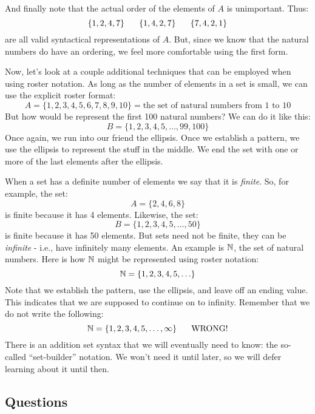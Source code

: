 \documentclass[letterpaper,12pt,fleqn]{article}
\begin{document}
And finally note that the actual order of the elements of $A$ is unimportant.
Thus:
\[\{1,2,4,7\}\hspace{4ex}\{1,4,2,7\}\hspace{4ex}\{7,4,2,1\}\]
are all valid syntactical representations of $A$. But, since we know that
the natural numbers do have an ordering, we feel more comfortable using the
first form.

Now, let's look at a couple additional techniques that can be employed when
using roster notation. As long as the number of elements in a set is small, we
can use the explicit roster format:
\[A=\{1,2,3,4,5,6,7,8,9,10\}=\mbox{the set of natural numbers from 1 to 10}\]
But how would be represent the first 100 natural numbers? We can do it like
this:
\[B=\{1,2,3,4,5,\ldots,99,100\}\]
Once again, we run into our friend the ellipsis. Once we establish a pattern,
we use the ellipsis to represent the stuff in the middle. We end the set with
one or more of the last elements after the ellipsis.

When a set has a definite number of elements we say that it is \emph{finite}.
So, for example, the set:
\[A=\{2,4,6,8\}\]
is finite because it has 4 elements. Likewise, the set:
\[B=\{1,2,3,4,5,\ldots,50\}\]
is finite because it has 50 elements. But sets need not be finite, they can
be \emph{infinite} - i.e., have infinitely many elements. An example is $\mathbb{N}$,
the set of natural numbers. Here is how $\mathbb{N}$ might be represented using roster
notation:
\[\mathbb{N}=\{1,2,3,4,5,\ldots\}\]
Note that we establish the pattern, use the ellipsis, and leave off an ending
value. This indicates that we are supposed to continue on to infinity. Remember
that we do not write the following:
\[\mathbb{N}=\{1,2,3,4,5,\ldots,\infty\}\hspace{4ex}\mbox{WRONG!}\]
There is an addition set syntax that we will eventually need to know: the
so-called ``set-builder'' notation. We won't need it until later, so we will
defer learning about it until then.

\subsection*{Questions}
\end{document}
